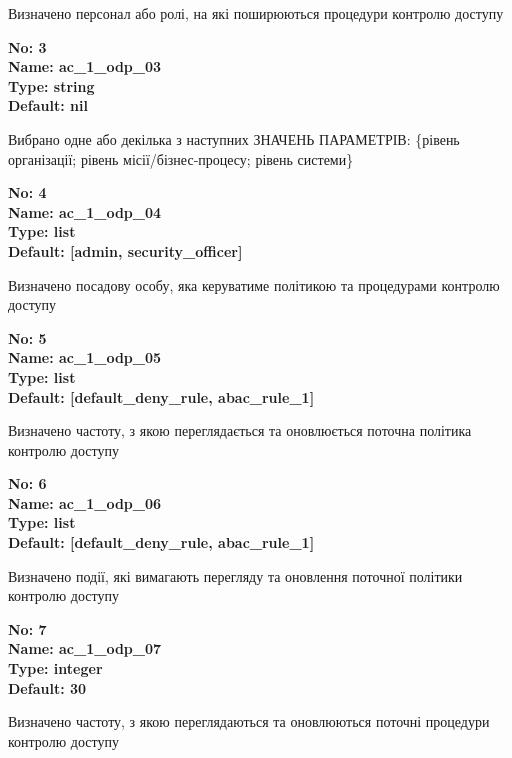 \documentclass{article}
\begin{document}
{\footnotesize Визначено персонал або ролі, на які поширюються процедури контролю доступу}


{\footnotesize\bfseries
No: 3\\
Name: ac\_\allowbreak{}1\_\allowbreak{}odp\_\allowbreak{}03\\
Type: string\\
Default: nil
}

{\footnotesize Вибрано одне або декілька з наступних ЗНАЧЕНЬ ПАРАМЕТРІВ: \{рівень організації; рівень місії/бізнес-процесу; рівень системи\}}


{\footnotesize\bfseries
No: 4\\
Name: ac\_\allowbreak{}1\_\allowbreak{}odp\_\allowbreak{}04\\
Type: list\\
Default: [\textquotedbl{}admin\textquotedbl{}, \textquotedbl{}security\_\allowbreak{}officer\textquotedbl{}]
}

{\footnotesize Визначено посадову особу, яка керуватиме політикою та процедурами контролю доступу}


{\footnotesize\bfseries
No: 5\\
Name: ac\_\allowbreak{}1\_\allowbreak{}odp\_\allowbreak{}05\\
Type: list\\
Default: [\textquotedbl{}default\_\allowbreak{}deny\_\allowbreak{}rule\textquotedbl{}, \textquotedbl{}abac\_\allowbreak{}rule\_\allowbreak{}1\textquotedbl{}]
}

{\footnotesize Визначено частоту, з якою переглядається та оновлюється поточна політика контролю доступу}


{\footnotesize\bfseries
No: 6\\
Name: ac\_\allowbreak{}1\_\allowbreak{}odp\_\allowbreak{}06\\
Type: list\\
Default: [\textquotedbl{}default\_\allowbreak{}deny\_\allowbreak{}rule\textquotedbl{}, \textquotedbl{}abac\_\allowbreak{}rule\_\allowbreak{}1\textquotedbl{}]
}

{\footnotesize Визначено події, які вимагають перегляду та оновлення поточної політики контролю доступу}


{\footnotesize\bfseries
No: 7\\
Name: ac\_\allowbreak{}1\_\allowbreak{}odp\_\allowbreak{}07\\
Type: integer\\
Default: 30
}

{\footnotesize Визначено частоту, з якою переглядаються та оновлюються поточні процедури контролю доступу}
\end{document}
